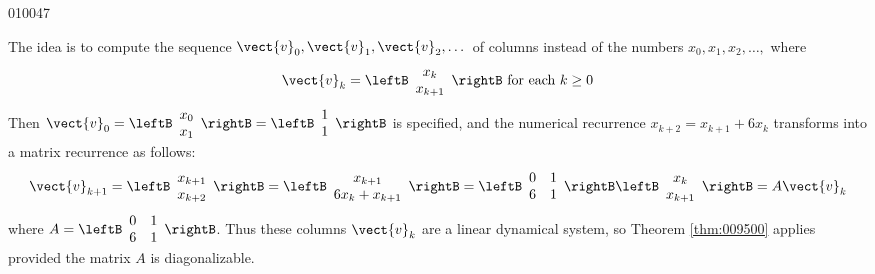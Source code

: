 \begin{example}{}{010047}
\begin{solution}
The idea is to compute the sequence $\vect{v}_{0}, \vect{v}_{1}, \vect{v}_{2}, \dots$  of columns instead of the numbers $x_{0}, x_{1}, x_{2}, \dots,$ where
\begin{equation*}
\vect{v}_k = \leftB \begin{array}{c}
x_k \\
x_{k+1} 
\end{array}\rightB
\mbox{ for each } k \geq 0
\end{equation*}
Then $\vect{v}_0 = \leftB \begin{array}{c}
x_0 \\
x_1
\end{array} \rightB = \leftB \begin{array}{c}
1 \\
1
\end{array}\rightB$
 is specified, and the numerical recurrence $x_{k+2} =x_{k+1} + 6x_{k}$ transforms into a matrix recurrence as follows:
\begin{equation*}
\vect{v}_{k+1} = \leftB \begin{array}{c}
x_{k+1} \\
x_{k+2}
\end{array}\rightB = \leftB \begin{array}{c}
x_{k+1} \\
6x_k + x_{k+1}
\end{array}\rightB = \leftB \begin{array}{rr}
0 & 1 \\
6 & 1 
\end{array}\rightB \leftB \begin{array}{c}
x_k \\
x_{k+1}
\end{array}\rightB = A \vect{v}_k
\end{equation*}
where $A = \leftB \begin{array}{rr}
0 & 1 \\
6 & 1 
\end{array}\rightB$.
 Thus these columns $\vect{v}_{k}$ are a linear dynamical system, so Theorem \ref{thm:009500} applies provided the matrix $A$ is diagonalizable.



\end{solution}
\end{example}
